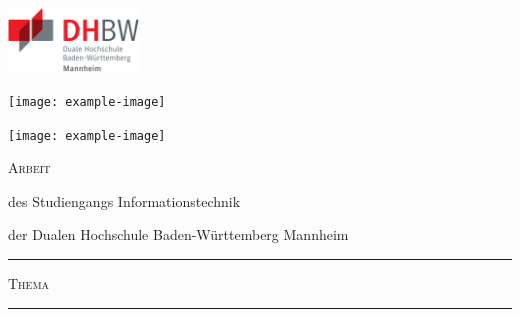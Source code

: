 \begin{titlepage}
    \begin{minipage}[c]{.30\textwidth}
        \includegraphics[height=1.7cm]{dhbw-logo}
    \end{minipage}
    \hfill
    \begin{minipage}[c]{.30\textwidth}
        \centering
        \texttt{[image: example-image]}
    \end{minipage}
    \hfill
    \begin{minipage}[c]{.30\textwidth}
        \raggedleft
        \texttt{[image: example-image]}
    \end{minipage}
    
    \begin{center}
    \Large\textsc{Arbeit}
    
    \normalsize
    des Studiengangs Informationstechnik\par
    der Dualen Hochschule Baden-Württemberg Mannheim
    \end{center}
    
    \rule{\textwidth}{.5mm}\bigskip
    
    \centering\textsc{\large Thema }
    
    {\bfseries \getThesisTitle}\bigskip
    
    
    \rule{\textwidth}{.5mm}
    
    \vfill
    

\end{titlepage}
